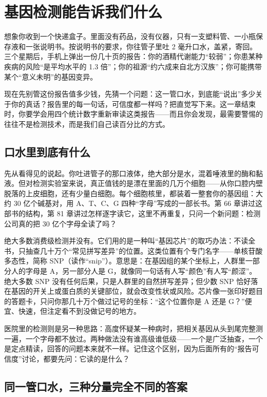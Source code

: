 \chapter{基因检测能告诉我们什么}

\begin{kaichang}
想象你收到一个快递盒子。里面没有药品，没有仪器，只有一支塑料管、一小瓶保存液和一张说明书。按说明书的要求，你往管子里吐 2 毫升口水，盖紧，寄回。三个星期后，手机上弹出一份几十页的报告：你的酒精代谢能力“较弱”；你患某种疾病的风险“是平均水平的 1.3 倍”；你的祖源“约六成来自北方汉族”；你可能携带某个“意义未明”的基因变异。

现在先别管这份报告值多少钱，先猜一个问题：这一管口水，到底能“说出”多少关于你的真话？报告里的每一句话，可信度都一样吗？把直觉写下来。这一章结束时，你要学会用四个统计数字重新审读这类报告——而且你会发现，最需要警惕的往往不是检测技术，而是我们自己读百分比的方式。
\end{kaichang}

\section{口水里到底有什么}

先从看得见的说起。你吐进管子的那口液体，绝大部分是水，混着唾液里的酶和黏液。但对检测实验室来说，真正值钱的是漂在里面的几万个细胞——从你口腔内壁脱落的上皮细胞，还有少量白细胞。每个细胞核里，都装着一整套你的基因组：大约 30 亿个碱基对，用 A、T、C、G 四种“字母”写成的一部长书。第 66 章讲过这部书的结构，第 81 章讲过怎样逐字读它，这里不再重复，只问一个新问题：检测公司真的把 30 亿个字母全读了吗？

绝大多数消费级检测并没有。它们用的是一种叫“基因芯片”的取巧办法：不读全书，只抽查几十万个“常见拼写差异”的位置。这类位置有个专门名字——单核苷酸多态性，简称 SNP（读作“snip”）。意思是：在基因组的某个坐标上，人群里一部分人的字母是 A，另一部分人是 G，就像同一句话有人写“颜色”有人写“颜涩”。绝大多数 SNP 没有任何后果，只是人群里的自然拼写差异；但少数 SNP 恰好落在基因的开关上或蛋白质的关键部位，就会改变性状或风险。芯片像一张印好题目的答题卡，只问你那几十万个做过记号的坐标：“这个位置你是 A 还是 G？”便宜、快速，但注定看不到没做记号的地方。

医院里的检测则是另一种思路：高度怀疑某一种病时，把相关基因从头到尾完整测一遍，一个字母都不放过。两种做法没有谁高级谁低级——一个是广泛抽查，一个是定点精读，回答的问题本来就不一样。记住这个区别，因为后面所有的“报告可信度”讨论，都要先问：它读的是什么？

\section{同一管口水，三种分量完全不同的答案}

